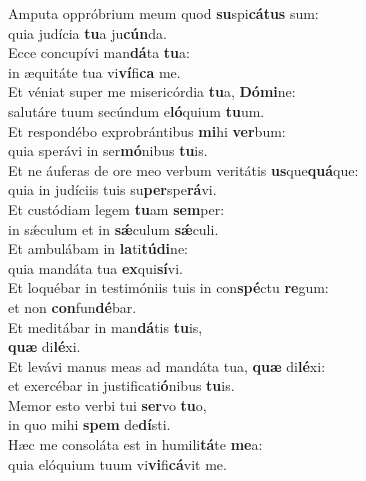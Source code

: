 \oddverse Amputa oppróbrium meum quod \textbf{su}spi\textbf{cá}\textbf{tus} sum:~\*\\
\oddverse quia judícia \textbf{tu}a ju\textbf{cún}da.\\
\evenverse Ecce concupívi man\textbf{dá}ta \textbf{tu}a:~\*\\
\evenverse in æquitáte tua vi\textbf{ví}fi\textbf{ca} me.\\
\oddverse Et véniat super me misericórdia \textbf{tu}a, \textbf{Dó}\textbf{mi}ne:~\*\\
\oddverse salutáre tuum secúndum e\textbf{ló}quium \textbf{tu}um.\\
\evenverse Et respondébo exprobrántibus \textbf{mi}hi \textbf{ver}bum:~\*\\
\evenverse quia sperávi in ser\textbf{mó}nibus \textbf{tu}is.\\
\oddverse Et ne áuferas de ore meo verbum veritátis \textbf{us}que\textbf{quá}que:~\*\\
\oddverse quia in judíciis tuis su\textbf{per}spe\textbf{rá}vi.\\
\evenverse Et custódiam legem \textbf{tu}am \textbf{sem}per:~\*\\
\evenverse in sǽculum et in \textbf{sǽ}culum \textbf{sǽ}culi.\\
\oddverse Et ambulábam in \textbf{la}ti\textbf{tú}\textbf{di}ne:~\*\\
\oddverse quia mandáta tua \textbf{ex}qui\textbf{sí}vi.\\
\evenverse Et loquébar in testimóniis tuis in con\textbf{spé}ctu \textbf{re}gum:~\*\\
\evenverse et non \textbf{con}fun\textbf{dé}bar.\\
\oddverse Et meditábar in man\textbf{dá}tis \textbf{tu}is,~\*\\
\oddverse \textbf{quæ} di\textbf{lé}xi.\\
\evenverse Et levávi manus meas ad mandáta tua, \textbf{quæ} di\textbf{lé}xi:~\*\\
\evenverse et exercébar in justificati\textbf{ó}nibus \textbf{tu}is.\\
\oddverse Memor esto verbi tui \textbf{ser}vo \textbf{tu}o,~\*\\
\oddverse in quo mihi \textbf{spem} de\textbf{dí}sti.\\
\evenverse Hæc me consoláta est in humili\textbf{tá}te \textbf{me}a:~\*\\
\evenverse quia elóquium tuum vi\textbf{vi}fi\textbf{cá}vit me.\\
